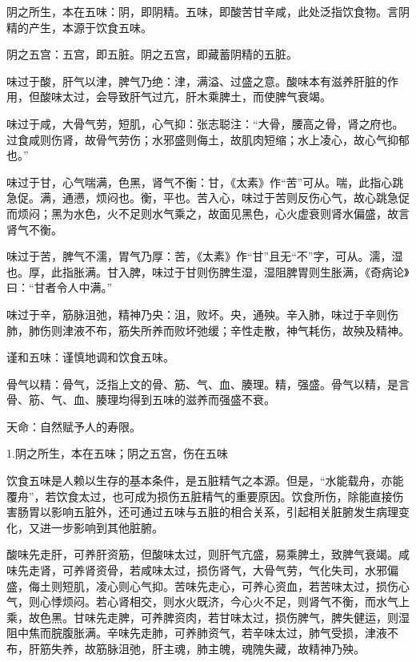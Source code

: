 \documentclass[draft,12pt]{ctexbook}
\begin{document}

\begin{jiaozhu}
  \item 阴之所生，本在五味：阴，即阴精。五味，即酸苦甘辛咸，此处泛指饮食物。言阴精的产生，本源于饮食五味。
  \item 阴之五宫：五宫，即五脏。阴之五宫，即藏蓄阴精的五脏。
  \item 味过于酸，肝气以津，脾气乃绝：津，满溢、过盛之意。酸味本有滋养肝脏的作用，但酸味太过，会导致肝气过亢，肝木乘脾土，而使脾气衰竭。
  \item 味过于咸，大骨气劳，短肌，心气抑：张志聪注：“大骨，腰高之骨，肾之府也。过食咸则伤肾，故骨气劳伤；水邪盛则侮土，故肌肉短缩；水上凌心，故心气抑郁也。”
  \item 味过于甘，心气喘满，色黑，肾气不衡：甘，《太素》作“苦”可从。喘，此指心跳急促。满，通懑，烦闷也。衡，平也。苦入心，味过于苦则反伤心气，故心跳急促而烦闷；黑为水色，火不足则水气乘之，故面见黑色，心火虚衰则肾水偏盛，故言肾气不衡。
  \item 味过于苦，脾气不濡，胃气乃厚：苦，《太素》作“甘”且无“不”字，可从。濡，湿也。厚，此指胀满。甘入脾，味过于甘则伤脾生湿，湿阻脾胃则生胀满，《奇病论》曰：“甘者令人中满。”
  \item 味过于辛，筋脉沮弛，精神乃央：沮，败坏。央，通殃。辛入肺，味过于辛则伤肺，肺伤则津液不布，筋失所养而败坏弛缓；辛性走散，神气耗伤，故殃及精神。
  \item 谨和五味：谨慎地调和饮食五味。
  \item 骨气以精：骨气，泛指上文的骨、筋、气、血、腠理。精，强盛。骨气以精，是言骨、筋、气、血、腠理均得到五味的滋养而强盛不衰。
  \item 天命：自然赋予人的寿限。
\end{jiaozhu}


1.阴之所生，本在五味；阴之五宫，伤在五味

饮食五味是人赖以生存的基本条件，是五脏精气之本源。但是，“水能载舟，亦能覆舟”，若饮食太过，也可成为损伤五脏精气的重要原因。饮食所伤，除能直接伤害肠胃以影响五脏外，还可通过五味与五脏的相合关系，引起相关脏腑发生病理变化，又进一步影响到其他脏腑。

酸味先走肝，可养肝资筋，但酸味太过，则肝气亢盛，易乘脾土，致脾气衰竭。咸味先走肾，可养肾资骨，若咸味太过，损伤肾气，大骨气劳，气化失司，水邪偏盛，侮土则短肌，凌心则心气抑。苦味先走心，可养心资血，若苦味太过，损伤心气，则心悸烦闷。若心肾相交，则水火既济，今心火不足，则肾气不衡，而水气上乘，故色黑。甘味先走脾，可养脾资肉，若甘味太过，损伤脾气，脾失健运，则湿阻中焦而脘腹胀满。辛味先走肺，可养肺资气，若辛味太过，肺气受损，津液不布，肝筋失养，故筋脉沮弛，肝主魂，肺主魄，魂隗失藏，故精神乃殃。
\end{document}
